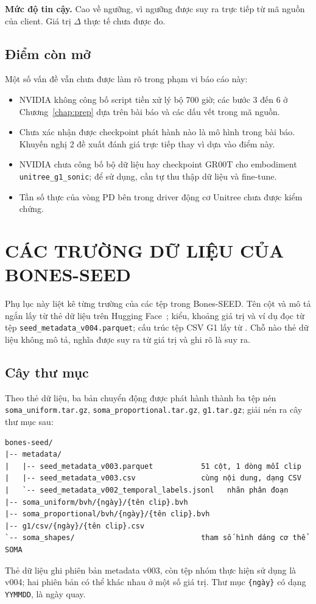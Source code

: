 \documentclass[12pt,a4paper,oneside]{report}
\newcommand{\code}[1]{\texttt{#1}}
\newcommand{\file}[1]{\path{#1}}
\begin{document}
\textbf{Mức độ tin cậy.} Cao về ngưỡng, vì ngưỡng được suy ra trực tiếp từ mã nguồn của client. Giá trị $\Delta$ thực tế chưa được đo.

\section{Điểm còn mở}

Một số vấn đề vẫn chưa được làm rõ trong phạm vi báo cáo này:
\begin{itemize}
\item NVIDIA không công bố script tiền xử lý bộ 700 giờ; các bước 3 đến 6 ở Chương~\ref{chap:prep} dựa trên bài báo và các dấu vết trong mã nguồn.
\item Chưa xác nhận được checkpoint phát hành nào là mô hình trong bài báo. Khuyến nghị 2 đề xuất đánh giá trực tiếp thay vì dựa vào điểm này.
\item NVIDIA chưa công bố bộ dữ liệu hay checkpoint GR00T cho embodiment \code{unitree\_g1\_sonic}; để sử dụng, cần tự thu thập dữ liệu và fine-tune.
\item Tần số thực của vòng PD bên trong driver động cơ Unitree chưa được kiểm chứng.
\end{itemize}

\appendix
\chapter{CÁC TRƯỜNG DỮ LIỆU CỦA BONES-SEED}
\label{app:fields}

Phụ lục này liệt kê từng trường của các tệp trong Bones-SEED. Tên cột và mô tả ngắn lấy từ thẻ dữ liệu trên Hugging Face~\cite{bonesseed}; kiểu, khoảng giá trị và ví dụ đọc từ tệp \code{seed\_metadata\_v004.parquet}; cấu trúc tệp CSV G1 lấy từ \file{convert_soma_csv_to_motion_lib.py}. Chỗ nào thẻ dữ liệu không mô tả, nghĩa được suy ra từ giá trị và ghi rõ là suy ra.

\section{Cây thư mục}

Theo thẻ dữ liệu, ba bản chuyển động được phát hành thành ba tệp nén \code{soma\_uniform.tar.gz}, \code{soma\_proportional.tar.gz}, \code{g1.tar.gz}; giải nén ra cây thư mục sau:
\begin{verbatim}
bones-seed/
|-- metadata/
|   |-- seed_metadata_v003.parquet           51 cột, 1 dòng mỗi clip
|   |-- seed_metadata_v003.csv               cùng nội dung, dạng CSV
|   `-- seed_metadata_v002_temporal_labels.jsonl   nhãn phân đoạn
|-- soma_uniform/bvh/{ngày}/{tên clip}.bvh
|-- soma_proportional/bvh/{ngày}/{tên clip}.bvh
|-- g1/csv/{ngày}/{tên clip}.csv
`-- soma_shapes/                             tham số hình dáng cơ thể SOMA
\end{verbatim}
Thẻ dữ liệu ghi phiên bản metadata v003, còn tệp nhóm thực hiện sử dụng là v004; hai phiên bản có thể khác nhau ở một số giá trị. Thư mục \code{\{ngày\}} có dạng \code{YYMMDD}, là ngày quay.
\end{document}
